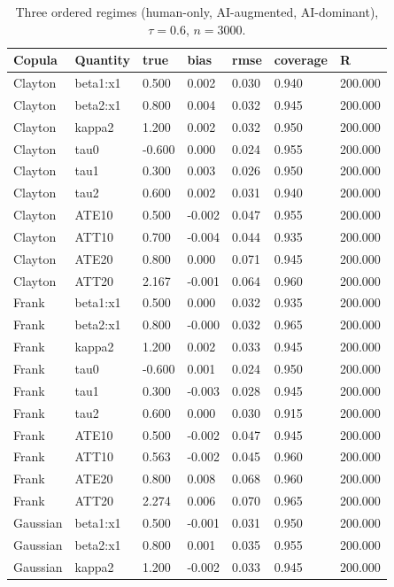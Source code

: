 \begin{table}[htbp]\centering\small
\caption{Three ordered regimes (human-only, AI-augmented, AI-dominant), $\tau = 0.6$, $n = 3000$.}\label{tab:mc-j3}
\begin{tabular}{lllllll}
\hline
Copula & Quantity & true & bias & rmse & coverage & R
\\ \hline
Clayton & beta1:x1 & 0.500 & 0.002 & 0.030 & 0.940 & 200.000 \\
Clayton & beta2:x1 & 0.800 & 0.004 & 0.032 & 0.945 & 200.000 \\
Clayton & kappa2 & 1.200 & 0.002 & 0.032 & 0.950 & 200.000 \\
Clayton & tau0 & -0.600 & 0.000 & 0.024 & 0.955 & 200.000 \\
Clayton & tau1 & 0.300 & 0.003 & 0.026 & 0.950 & 200.000 \\
Clayton & tau2 & 0.600 & 0.002 & 0.031 & 0.940 & 200.000 \\
Clayton & ATE10 & 0.500 & -0.002 & 0.047 & 0.955 & 200.000 \\
Clayton & ATT10 & 0.700 & -0.004 & 0.044 & 0.935 & 200.000 \\
Clayton & ATE20 & 0.800 & 0.000 & 0.071 & 0.945 & 200.000 \\
Clayton & ATT20 & 2.167 & -0.001 & 0.064 & 0.960 & 200.000 \\
Frank & beta1:x1 & 0.500 & 0.000 & 0.032 & 0.935 & 200.000 \\
Frank & beta2:x1 & 0.800 & -0.000 & 0.032 & 0.965 & 200.000 \\
Frank & kappa2 & 1.200 & 0.002 & 0.033 & 0.945 & 200.000 \\
Frank & tau0 & -0.600 & 0.001 & 0.024 & 0.950 & 200.000 \\
Frank & tau1 & 0.300 & -0.003 & 0.028 & 0.945 & 200.000 \\
Frank & tau2 & 0.600 & 0.000 & 0.030 & 0.915 & 200.000 \\
Frank & ATE10 & 0.500 & -0.002 & 0.047 & 0.945 & 200.000 \\
Frank & ATT10 & 0.563 & -0.002 & 0.045 & 0.960 & 200.000 \\
Frank & ATE20 & 0.800 & 0.008 & 0.068 & 0.960 & 200.000 \\
Frank & ATT20 & 2.274 & 0.006 & 0.070 & 0.965 & 200.000 \\
Gaussian & beta1:x1 & 0.500 & -0.001 & 0.031 & 0.950 & 200.000 \\
Gaussian & beta2:x1 & 0.800 & 0.001 & 0.035 & 0.955 & 200.000 \\
Gaussian & kappa2 & 1.200 & -0.002 & 0.033 & 0.945 & 200.000 \\

\end{tabular}
\end{table}
